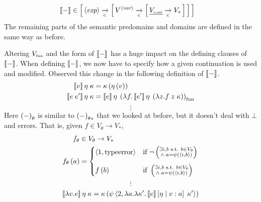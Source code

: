 \begin{enumcirc}
\begin{align*}
		\left\llbracket - \right\rrbracket       & \in \left[ \, 
			\left\langle \textit{exp} \right\rangle \xrightarrow[c]{}
			\left[ \, 
				V^{\left\langle \textit{var} \right\rangle} \xrightarrow[c]{}
				\left[ \, 
					\underline{V_{\textrm{\tiny cont}}} \xrightarrow[c]{} V_*
				 \, \right]
			 \, \right]
		 \, \right]
	\end{align*}
	The remaining parts of the semantic predomains and domains are defined in the
	same way as before.
	\item
	Altering $V_{\textrm{\tiny fun}}$ and the form of $\left\llbracket - \right\rrbracket$ has a huge impact
	on the defining clauses of $\left\llbracket - \right\rrbracket$.
	When defining $\left\llbracket - \right\rrbracket$, we now have to specify how a given continuation
	is used and modified.
	Observed this change in the following definition of $\left\llbracket - \right\rrbracket$.
	\begin{align*}
		\left\llbracket v \right\rrbracket \eta \; \kappa       & = \kappa \left(  \eta \left( v \right)  \right) \\
		\left\llbracket e \; e' \right\rrbracket \eta \; \kappa & = \left\llbracket e \right\rrbracket \eta \; \left( 
			\lambda f . \left\llbracket e' \right\rrbracket \eta \; \left( 
				\lambda z . f \; z \; \kappa
			 \right)
		 \right)_{\textrm{fun}}                                                       \\
	\end{align*}
	\[ \vdots \]
	Here $\left( - \right)_\theta$ is similar to $\left( - \right)_{\theta*}$ that we looked at
	before, but it doesn't deal with $\bot$ and errors.
	That is, given $f \in V_\theta \to V_*$,
	\begin{align*}
		f_\theta           & \in V_\theta \to V_* \\
		f_\theta \left( a \right) & =
		\begin{cases}
			\left\langle 1, \textrm{typeerror} \right\rangle & \textrm{if } \neg \left( \substack{\exists i, b \textrm{ s.t. } b \in V_\theta \\ \wedge \; a = \psi\left( \left\langle i, b \right\rangle \right)} \right) \\[1em]
			f \left( b \right)                      & \textrm{if }      \left( \substack{\exists i, b \textrm{ s.t. } b \in V_\theta \\ \wedge \; a = \psi\left( \left\langle i, b \right\rangle \right)} \right)
		\end{cases}
	\end{align*}
	\[ \vdots \]
	\begin{align*}
		\bbrackets{\lambda v . e} \eta \; \kappa         & = \kappa \prths{
			\psi \chevrons{
				2, \lambda a . \lambda \kappa' . \bbrackets{e} \aug{\eta}{v:a} \; \kappa'
			}
		}                                                                                                                                               \\

\end{align*}
\end{enumcirc}
